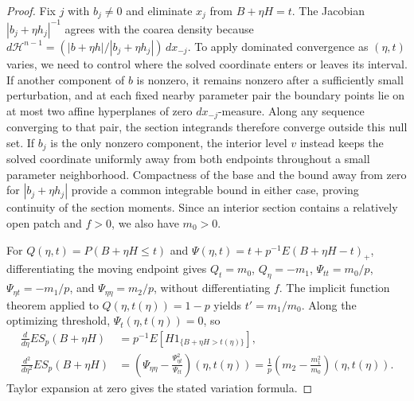 \begin{proof}
Fix \(j\) with \(b_j\ne0\) and eliminate \(x_j\) from \(B+\eta H=t\). The Jacobian \(|b_j+\eta h_j|^{-1}\) agrees with the coarea density because \(d\mathcal H^{n-1}=(|b+\eta h|/|b_j+\eta h_j|)\,dx_{-j}\). To apply dominated convergence as \((\eta,t)\) varies, we need to control where the solved coordinate enters or leaves its interval. If another component of \(b\) is nonzero, it remains nonzero after a sufficiently small perturbation, and at each fixed nearby parameter pair the boundary points lie on at most two affine hyperplanes of zero \(dx_{-j}\)-measure. Along any sequence converging to that pair, the section integrands therefore converge outside this null set. If \(b_j\) is the only nonzero component, the interior level \(v\) instead keeps the solved coordinate uniformly away from both endpoints throughout a small parameter neighborhood. Compactness of the base and the bound away from zero for \(|b_j+\eta h_j|\) provide a common integrable bound in either case, proving continuity of the section moments. Since an interior section contains a relatively open patch and \(f>0\), we also have \(m_0>0\).

For \(Q(\eta,t)=P(B+\eta H\le t)\) and \(\Psi(\eta,t)=t+p^{-1}E(B+\eta H-t)_+\), differentiating the moving endpoint gives \(Q_t=m_0\), \(Q_\eta=-m_1\), \(\Psi_{tt}=m_0/p\), \(\Psi_{\eta t}=-m_1/p\), and \(\Psi_{\eta\eta}=m_2/p\), without differentiating \(f\). The implicit function theorem applied to \(Q(\eta,t(\eta))=1-p\) yields \(t'=m_1/m_0\). Along the optimizing threshold, \(\Psi_t(\eta,t(\eta))=0\), so
\[
\begin{aligned}
\frac{d}{d\eta}ES_p(B+\eta H)&=p^{-1}E[H1_{\{B+\eta H>t(\eta)\}}],\\
\frac{d^2}{d\eta^2}ES_p(B+\eta H)&=\left(\Psi_{\eta\eta}-\frac{\Psi_{\eta t}^2}{\Psi_{tt}}\right)(\eta,t(\eta))
=\frac1p\left(m_2-\frac{m_1^2}{m_0}\right)(\eta,t(\eta)).
\end{aligned}
\]
Taylor expansion at zero gives the stated variation formula.
\end{proof}
